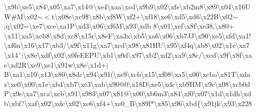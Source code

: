 \textbackslash{}x9b\textbackslash{}xe5\textbackslash{}x84\textbackslash{}x05\textbackslash{}xa7\textbackslash{}x14@\textbackslash{}xe4\textbackslash{}xaa\textbackslash{}xcd\textbackslash{}x9b9\textbackslash{}x02\textbackslash{}xfe\textbackslash{}xb2m8\textbackslash{}x89\textbackslash{}x04\textbackslash{}x16\+UW\#M\textbackslash{}x02$\sim$$<$t\textbackslash{}x08e\textbackslash{}xc9\$\textbackslash{}x8b\textbackslash{}xf8\+W\textbackslash{}xf2+\textbackslash{}xf18\textbackslash{}xe6\textbackslash{}xd5\textbackslash{}xd6\textbackslash{}x22\+B\textbackslash{}x02$\sim$;q\textbackslash{}x02=\textbackslash{}xe7\textbackslash{}xce\textbackslash{}xa1\+P\textbackslash{}xd3\textbackslash{}x06\textbackslash{}xf6\+M\textbackslash{}x93\textbackslash{}xdb 8\textbackslash{}x01\textbackslash{}xef\textbackslash{}x8f\textbackslash{}xe38,\textbackslash{}x80+ \textbackslash{}x11\textbackslash{}xa5\textbackslash{}xcb8\textbackslash{}x8d\textbackslash{}xc8\textbackslash{}x15r\textbackslash{}x8e\+F\textbackslash{}xa3x\textbackslash{}xb5\textbackslash{}xa6\textbackslash{}x06\textbackslash{}xb7\+J\+J\textbackslash{}x90\textbackslash{}xe5\textbackslash{}xfd\textbackslash{}xa1!\textbackslash{}xf6n\textbackslash{}x16\textbackslash{}x17\textbackslash{}xb3/\textbackslash{}x9f\textbackslash{}x11g\textbackslash{}xa7\textbackslash{}xcd\textbackslash{}x98\textbackslash{}x81\+H\+U\textbackslash{}x95\textbackslash{}xf4q\textbackslash{}xb8\textbackslash{}x02\textbackslash{}x1e\textbackslash{}xa7\textbackslash{}x14\`{};\textbackslash{}x8e\textbackslash{}xdf\textbackslash{}x02\textbackslash{}x0fe\+E\+E\+P\+U\textbackslash{}xb1\textbackslash{}x0d\textbackslash{}x97\textbackslash{}xb2\textbackslash{}xd2\textbackslash{}xa9\textbackslash{}x8c/\textbackslash{}xcd\textbackslash{}x9f\textbackslash{}x8f\textbackslash{}xae\textbackslash{}xd2\+R\textbackslash{}xe9\textquotesingle{}\textbackslash{}xe1\textbackslash{}x91w\textbackslash{}x8e\textbackslash{}x1d+$\vert$B\textbackslash{}xa1\textbackslash{}x10\textbackslash{}x13\textbackslash{}x80\textbackslash{}x8dc\textbackslash{}x94\textbackslash{}x91(\textbackslash{}xe9\textbackslash{}xcb\textbackslash{}x15\textbackslash{}xf08\textbackslash{}xa5\textbackslash{}x00\textbackslash{}xcbo\textbackslash{}x81\+T\textbackslash{}xdaz\textbackslash{}xe0\textbackslash{}x00\textbackslash{}x1e\textbackslash{}xb4\textbackslash{}xb7\textbackslash{}xc3\textbackslash{}xab\textbackslash{}x90@0\textbackslash{}x18\+D\textbackslash{}xe5\textbackslash{}xdc\textbackslash{}xb9\+H\+M\textbackslash{}x9c\textbackslash{}x08\textbackslash{}xcb0d\+P\textbackslash{}x9e\textbackslash{}xa7\textbackslash{}xca\textbackslash{}xcb\textbackslash{}x91\textbackslash{}x983\textbackslash{}x07\textbackslash{}x81@\textbackslash{}x00\textbackslash{}xb6m3\textbackslash{}x84\textbackslash{}xf0\textbackslash{}x07\textbackslash{}x1d\textbackslash{}x1dh\textbackslash{}xdb\textbackslash{}xbf?\textbackslash{}xaf\textbackslash{}x02\textbackslash{}xdc\textbackslash{}x02\textbackslash{}xe6\textbackslash{}xf4+\textbackslash{}xe0\+\_\+\+B\textbackslash{}x89l$\ast$\textbackslash{}x85\textbackslash{}x96\textbackslash{}xbd\{\textbackslash{}x91jk\textbackslash{}x93\textbackslash{}x228 